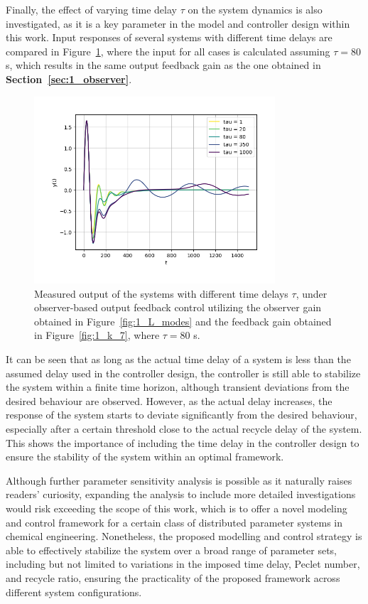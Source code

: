 Finally, the effect of varying time delay $\tau$ on the system dynamics is also investigated, as it is a key parameter in the model and controller design within this work. Input responses of several systems with different time delays are compared in Figure~\ref{fig:1_tau_sensitivity}, where the input for all cases is calculated assuming $\tau = 80$ s, which results in the same output feedback gain as the one obtained in \textbf{Section~\ref{sec:1_observer}}.

\begin{figure}[!htbp]
    \centering
    \includegraphics[width=0.8\textwidth]{papers/1_optimal/figures/y_vs_t.png}
    \caption{Measured output of the systems with different time delays $\tau$, under observer-based output feedback control utilizing the observer gain obtained in Figure~\ref{fig:1_L_modes} and the feedback gain obtained in Figure~\ref{fig:1_k_7}, where $\tau = 80$ s.}
    \label{fig:1_tau_sensitivity}
\end{figure}

It can be seen that as long as the actual time delay of a system is less than the assumed delay used in the controller design, the controller is still able to stabilize the system within a finite time horizon, although transient deviations from the desired behaviour are observed. However, as the actual delay increases, the response of the system starts to deviate significantly from the desired behaviour, especially after a certain threshold close to the actual recycle delay of the system. This shows the importance of including the time delay in the controller design to ensure the stability of the system within an optimal framework.

Although further parameter sensitivity analysis is possible as it naturally raises readers' curiosity, expanding the analysis to include more detailed investigations would risk exceeding the scope of this work, which is to offer a novel modeling and control framework for a certain class of distributed parameter systems in chemical engineering. Nonetheless, the proposed modelling and control strategy is able to effectively stabilize the system over a broad range of parameter sets, including but not limited to variations in the imposed time delay, Peclet number, and recycle ratio, ensuring the practicality of the proposed framework across different system configurations.